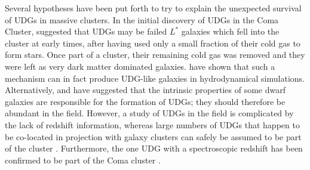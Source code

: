 \documentclass[usenatbib,fleqn]{mnras}
\begin{document}
Several hypotheses have been put forth to try to explain the unexpected survival of UDGs in massive clusters. In the initial discovery of UDGs in the Coma Cluster, \cite{vandokkum15_coma} suggested that UDGs may be failed $L^*$ galaxies which fell into the cluster at early times, after having used only a small fraction of their cold gas to form stars. Once part of a cluster, their remaining cold gas was removed and they were left as very dark matter dominated galaxies.
\cite{yozin15} have shown that such a mechanism can in fact produce UDG-like galaxies in hydrodynamical simulations.
Alternatively, \cite{amorisco16} and \cite{dicintio17} have suggested that the intrinsic properties of some dwarf galaxies are responsible for the formation of UDGs; they should therefore be abundant in the field. However, a study of UDGs in the field is complicated by the lack of redshift information, whereas large numbers of UDGs that happen to be co-located in projection with galaxy clusters can safely be assumed to be part of the cluster \citep[or at least a significant fraction of them; e.g.,][]{vdburg16}. Furthermore, the one UDG with a spectroscopic redshift has been confirmed to be part of the Coma cluster \citep{vandokkum15_spec}.
\end{document}
